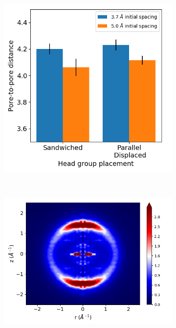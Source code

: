 \documentclass[journal=jpcbfk,manusciprt=article]{achemso}
\begin{document}
\begin{figure}[!hbt]
\begin{subfigure}{0.45\linewidth}
                \includegraphics[width=\linewidth]{p2p2.png}
                \caption{}~\label{fig:p2p_disordered}
        \end{subfigure}
        \begin{subfigure}{0.45\linewidth}
                \centering
                \includegraphics[width=\linewidth]{disorder_offset_rzplot.png}
                \caption{}~\label{fig:offset_disordered_xrd}
        \end{subfigure}%

\end{figure}
\end{document}
